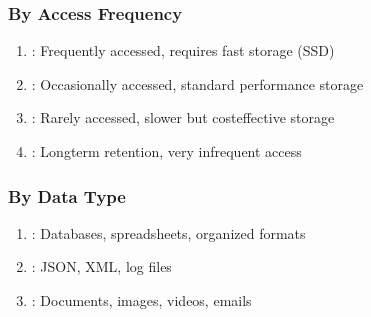 \documentclass[letterpaper,10pt,english]{sphinxmanual}
\begin{document}
\subsubsection{By Access Frequency}
\label{\detokenize{data-organization:by-access-frequency}}\begin{enumerate}
%
\item {} 
\sphinxAtStartPar
{}: Frequently accessed, requires fast storage (SSD)

\item {} 
\sphinxAtStartPar
{}: Occasionally accessed, standard performance storage

\item {} 
\sphinxAtStartPar
{}: Rarely accessed, slower but cost\sphinxhyphen{}effective storage

\item {} 
\sphinxAtStartPar
{}: Long\sphinxhyphen{}term retention, very infrequent access

\end{enumerate}


\subsubsection{By Data Type}
\label{\detokenize{data-organization:by-data-type}}\begin{enumerate}
%
\item {} 
\sphinxAtStartPar
{}: Databases, spreadsheets, organized formats

\item {} 
\sphinxAtStartPar
{}: JSON, XML, log files

\item {} 
\sphinxAtStartPar
{}: Documents, images, videos, emails

\end{enumerate}
\end{document}

